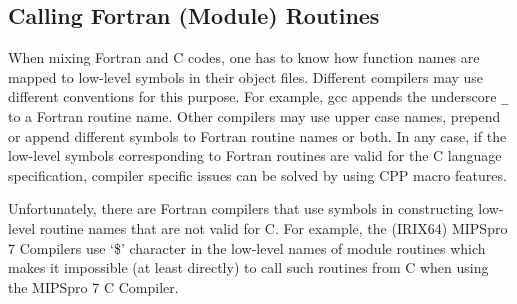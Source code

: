 \documentclass[twocolumn]{article}
\begin{document}
\subsection{Calling Fortran (Module) Routines}
\label{sec:callrout}

When mixing Fortran and C codes, one has to know how function names
are mapped to low-level symbols in their object files. Different
compilers may use different conventions for this purpose. For example, gcc
appends the underscore \texttt{\_} to a Fortran routine name. Other
compilers may use upper case names, prepend or append different
symbols to Fortran routine names or both. In any case, if the
low-level symbols corresponding to Fortran routines are valid for the
C language specification, compiler specific issues can be solved by
using CPP macro features.

Unfortunately, there are Fortran compilers that use symbols in
constructing low-level routine names that are not valid for C. For
example, the (IRIX64) MIPSpro 7 Compilers use `\$' character in the
low-level names of module routines which makes it impossible (at
least directly) to call such routines from C when using the MIPSpro 7
C Compiler.
\end{document}
